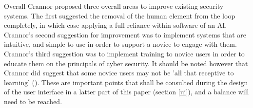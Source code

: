 Overall Crannor proposed three overall areas to improve existing security systems. The first suggested the removal of the human element from the loop completely, in which case applying a full reliance within software of an AI. Crannor's second suggestion for improvement was to implement systems that are intuitive, and simple to use in order to support a novice to engage with them. Crannor's third suggestion was to implement training to novice users in order to educate them on the principals of cyber security. It should be noted however that Crannor did suggest that some novice users may not be 'all that receptive to learning' (\cite{cranor2008framework}). These are important points that shall be consulted during the design of the user interface in a latter part of this paper (section \ref{ui}), and a balance will need to be reached. 